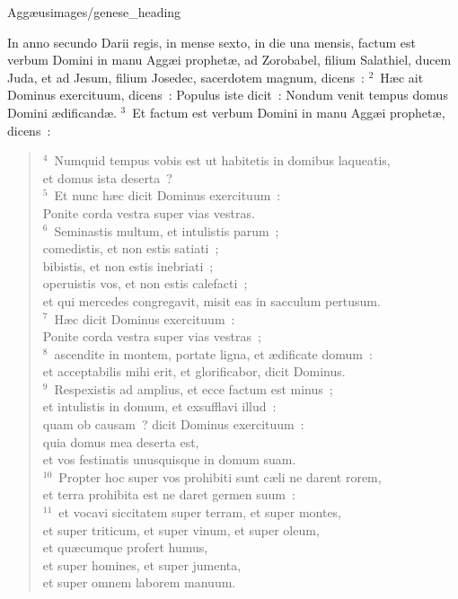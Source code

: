 {Aggæus}{images/genese_heading}


\lettrine[lines=6,image=true,loversize=0.05,lraise=-0.03]{I}{}n anno secundo Darii regis, in mense sexto, in die una mensis, factum est verbum Domini in manu Agg\ae i prophet\ae , ad Zorobabel, filium Salathiel, ducem Juda, et ad Jesum, filium Josedec, sacerdotem magnum, dicens~:
${}^{2}$~H\ae c ait Dominus exercituum, dicens~: Populus iste dicit~: Nondum venit tempus domus Domini \ae dificand\ae .
${}^{3}$~Et factum est verbum Domini in manu Agg\ae i prophet\ae , dicens~:
\begin{flushleft}\begin{verse}${}^{4}$~Numquid tempus vobis est ut habitetis in domibus laqueatis,\\ et domus ista deserta~?\\
${}^{5}$~Et nunc h\ae c dicit Dominus exercituum~:\\ Ponite corda vestra super vias vestras.\\
${}^{6}$~Seminastis multum, et intulistis parum~;\\ comedistis, et non estis satiati~;\\ bibistis, et non estis inebriati~;\\ operuistis vos, et non estis calefacti~;\\ et qui mercedes congregavit, misit eas in sacculum pertusum.\\
${}^{7}$~H\ae c dicit Dominus exercituum~:\\ Ponite corda vestra super vias vestras~;\\
${}^{8}$~ascendite in montem, portate ligna, et \ae dificate domum~:\\ et acceptabilis mihi erit, et glorificabor, dicit Dominus.\\
${}^{9}$~Respexistis ad amplius, et ecce factum est minus~;\\ et intulistis in domum, et exsufflavi illud~:\\ quam ob causam~? dicit Dominus exercituum~:\\ quia domus mea deserta est,\\ et vos festinatis unusquisque in domum suam.\\
${}^{10}$~Propter hoc super vos prohibiti sunt c\ae li ne darent rorem,\\ et terra prohibita est ne daret germen suum~:\\
${}^{11}$~et vocavi siccitatem super terram, et super montes,\\ et super triticum, et super vinum, et super oleum,\\ et qu\ae cumque profert humus,\\ et super homines, et super jumenta,\\ et super omnem laborem manuum.\end{verse}\end{flushleft}


